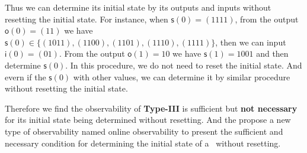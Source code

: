 Thus we can determine its initial state by its outputs and inputs without resetting the initial state. For instance, when $\mathsf{s}(0)=(1111)$, from the output $\mathsf{o}(0)=(11)$ we have $\mathsf{s}(0)\in \{(1011),(1100),(1101),(1110),(1111)\}$, then we can input $\mathsf{i}(0)=(01)$. From the output $\mathsf{o}(1)=10$ we have $\mathsf{s}(1)=1001$ and then determine $\mathsf{s}(0)$. In this procedure, we do not need to reset the initial state. And evern if the $\mathsf{s}(0)$ with other values, we can determine it by similar procedure without resetting the initial state.



Therefore we find the observability of  {\bf Type-III}  is sufficient but {\bf not necessary} for its initial state being determined without resetting. And the propose a new type of observability named online observability to present the sufficient and necessary condition for determining the initial state of a \BCN\  without  resetting.


   


